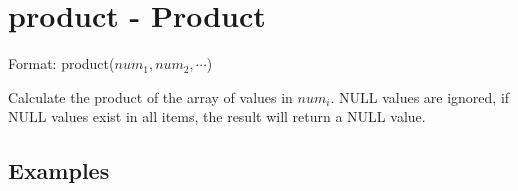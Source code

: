 
%

\section{product - Product\label{sect:product}}

Format: product($num_1,num_2,\cdots$)

Calculate the product of the array of values in $num_i$. NULL values are ignored, if NULL values exist in all items, the result will return a NULL value. 


\subsection*{Examples}


%

